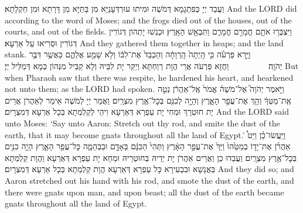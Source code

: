 {{וַעֲבַד יְיָ כְּפִתְגָמָא דְּמֹשֶׁה וּמִיתוּ עוּרְדְּעָנַיָּא מִן בָּתַּיָּא מִן דָּרָתָא וּמִן חַקְלָתָא׃}
{And the LORD did according to the word of Moses; and the frogs died out of the houses, out of the courts, and out of the fields.}{}
{וַיִּצְבְּר֥וּ אֹתָ֖ם חֳמָרִ֣ם חֳמָרִ֑ם וַתִּבְאַ֖שׁ הָאָֽרֶץ׃
}
{וּכְנַשׁוּ יָתְהוֹן דְּגוֹרִין דְּגוֹרִין וּסְרִיאוּ עַל אַרְעָא׃}
{And they gathered them together in heaps; and the land stank.}{}
{וַיַּ֣רְא פַּרְעֹ֗ה כִּ֤י הָֽיְתָה֙ הָֽרְוָחָ֔ה וְהַכְבֵּד֙ אֶת־לִבּ֔וֹ וְלֹ֥א שָׁמַ֖ע אֲלֵהֶ֑ם כַּאֲשֶׁ֖ר דִּבֶּ֥ר יְהֹוָֽה׃ \setuma         
}
{וַחֲזָא פַּרְעֹה אֲרֵי הֲוָת רְוַחְתָּא וְיַקַּר יָת לִבֵּיהּ וְלָא קַבֵּיל מִנְּהוֹן כְּמָא דְּמַלֵּיל יְיָ׃}
{But when Pharaoh saw that there was respite, he hardened his heart, and hearkened not unto them; as the LORD had spoken.}{}
{וַיֹּ֣אמֶר יְהֹוָה֮ אֶל־מֹשֶׁה֒ אֱמֹר֙ אֶֽל־אַהֲרֹ֔ן נְטֵ֣ה אֶֽת־מַטְּךָ֔ וְהַ֖ךְ אֶת־עֲפַ֣ר הָאָ֑רֶץ וְהָיָ֥ה לְכִנִּ֖ם בְּכׇל־אֶ֥רֶץ מִצְרָֽיִם׃
}
{וַאֲמַר יְיָ לְמֹשֶׁה אֵימַר לְאַהֲרֹן אֲרֵים יָת חוּטְרָךְ וּמְחִי יָת עַפְרָא דְּאַרְעָא וִיהֵי לְקַלְמְתָא בְּכָל אַרְעָא דְּמִצְרָיִם׃}
{And the LORD said unto Moses: ‘Say unto Aaron: Stretch out thy rod, and smite the dust of the earth, that it may become gnats throughout all the land of Egypt.’}{}
{וַיַּֽעֲשׂוּ־כֵ֗ן וַיֵּט֩ אַהֲרֹ֨ן אֶת־יָד֤וֹ בְמַטֵּ֙הוּ֙ וַיַּךְ֙ אֶת־עֲפַ֣ר הָאָ֔רֶץ וַתְּהִי֙ הַכִּנָּ֔ם בָּאָדָ֖ם וּבַבְּהֵמָ֑ה כׇּל־עֲפַ֥ר הָאָ֛רֶץ הָיָ֥ה כִנִּ֖ים בְּכׇל־אֶ֥רֶץ מִצְרָֽיִם׃
}
{וַעֲבַדוּ כֵן וַאֲרֵים אַהֲרֹן יָת יְדֵיהּ בְּחוּטְרֵיהּ וּמְחָא יָת עַפְרָא דְּאַרְעָא וַהֲוָת קַלְמְתָא בַּאֲנָשָׁא וּבִבְעִירָא כָּל עַפְרָא דְּאַרְעָא הֲוָת קַלְמְתָא בְּכָל אַרְעָא דְּמִצְרָיִם׃}
{And they did so; and Aaron stretched out his hand with his rod, and smote the dust of the earth, and there were gnats upon man, and upon beast; all the dust of the earth became gnats throughout all the land of Egypt.}{}
}
